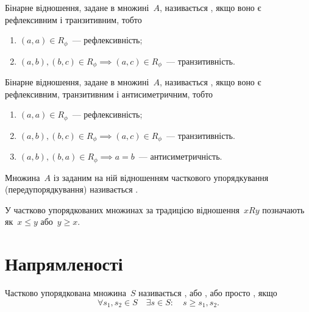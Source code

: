 \begin{definition}
    Бінарне відношення, задане в множині~$A$, називається , якщо воно є рефлексивним і транзитивним, тобто
    \begin{enumerate}
        \item $(a, a) \in R_\phi$~--- рефлексивність;
        \item $(a, b), (b, c) \in R_\phi \implies (a, c) \in R_\phi$~--- транзитивність.
    \end{enumerate}
\end{definition}

\begin{definition}
    Бінарне відношення, задане в множині~$A$, називається , якщо воно є рефлексивним, транзитивним і антисиметричним, тобто
    \begin{enumerate}
        \item $(a, a) \in R_\phi$~--- рефлексивність;
        \item $(a, b), (b, c) \in R_\phi \implies (a, c) \in R_\phi$~--- транзитивність.
        \item $(a, b), (b, a) \in R_\phi \implies a = b$~--- антисиметричність.
    \end{enumerate}
\end{definition}

\begin{definition}
    Множина~$A$ із заданим на ній відношенням часткового упорядкування (передупорядкування) називається .
\end{definition}

\begin{remark}
    У частково упорядкованих множинах за традицією відношення~$x R y$ позначають як~$x \le y$ або~$y \ge x$.
\end{remark}

\section{Напрямленості}

\begin{definition}
    Частково упорядкована множина~$S$ називається , або , або просто , якщо
    \begin{equation*}
        \forall s_1, s_2 \in S \quad \exists s \in S: \quad s \ge s_1, s_2.
    \end{equation*}
\end{definition}

